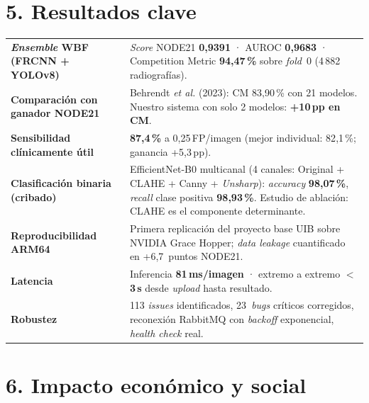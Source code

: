 \documentclass[11pt,a4paper]{article}
\begin{document}
\section*{5. Resultados clave}

\renewcommand{\arraystretch}{1.1}
\begin{tabularx}{\textwidth}{@{}lX@{}}
\textbf{\emph{Ensemble} WBF (FRCNN + YOLOv8)} & \emph{Score} NODE21 \textbf{0{,}9391} · AUROC \textbf{0{,}9683} · Competition Metric \textbf{94{,}47\,\%} sobre \emph{fold}~0 (4\,882 radiografías). \\
\textbf{Comparación con ganador NODE21} & Behrendt \emph{et al.} (2023): CM 83{,}90\,\% con 21 modelos. Nuestro sistema con solo 2 modelos: \textbf{+10\,pp en CM}. \\
\textbf{Sensibilidad clínicamente útil} & \textbf{87{,}4\,\%} a 0{,}25\,FP/imagen (mejor individual: 82{,}1\,\%; ganancia +5{,}3\,pp). \\
\textbf{Clasificación binaria (cribado)} & EfficientNet-B0 multicanal (4 canales: Original + CLAHE + Canny + \emph{Unsharp}): \emph{accuracy} \textbf{98{,}07\,\%}, \emph{recall} clase positiva \textbf{98{,}93\,\%}. Estudio de ablación: CLAHE es el componente determinante. \\
\textbf{Reproducibilidad ARM64} & Primera replicación del proyecto base UIB sobre NVIDIA Grace Hopper; \emph{data leakage} cuantificado en +6{,}7~puntos NODE21. \\
\textbf{Latencia} & Inferencia \textbf{81\,ms/imagen} · extremo a extremo \textbf{$<$3\,s} desde \emph{upload} hasta resultado. \\
\textbf{Robustez} & 113 \emph{issues} identificados, 23~\emph{bugs} críticos corregidos, reconexión RabbitMQ con \emph{backoff} exponencial, \emph{health check} real. \\
\end{tabularx}

\section*{6. Impacto económico y social}
\end{document}
